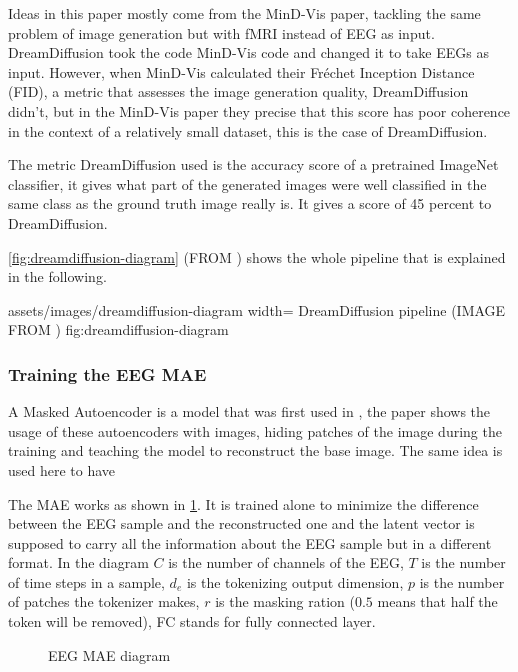 Ideas in this paper mostly come from the MinD-Vis \cite{mindvis} paper, tackling
the same problem of image generation but with fMRI instead of EEG as input.
DreamDiffusion took the code MinD-Vis code and changed it to take EEGs as input.
However, when MinD-Vis calculated their Fréchet Inception Distance \cite{fid}
(FID), a metric that assesses the image generation quality, DreamDiffusion
didn't, but in the MinD-Vis paper they precise that this score has poor
coherence in the context of a relatively small dataset, this is the case of
DreamDiffusion.

The metric DreamDiffusion used is the accuracy score of a pretrained ImageNet
classifier, it gives what part of the generated images were well classified in
the same class as the ground truth image really is. It gives a score of 45
percent to DreamDiffusion.

\cref{fig:dreamdiffusion-diagram} (FROM \cite{dreamdiffusion}) shows the whole
pipeline that is explained in the following.

\insertfigure
    {assets/images/dreamdiffusion-diagram}
    {width=\textwidth}
    {DreamDiffusion pipeline (IMAGE FROM \cite{dreamdiffusion})}
    {fig:dreamdiffusion-diagram}

\subsubsection{Training the EEG MAE}

A Masked Autoencoder is a model that was first used in \cite{mae}, the paper
shows the usage of these autoencoders with images, hiding patches of the image
during the training and teaching the model to reconstruct the base image. The
same idea is used here to have  

The MAE works as shown in \cref{fig:eeg-mae-diagram}. It is trained alone to
minimize the difference between the EEG sample and the reconstructed one and the
latent vector is supposed to carry all the information about the EEG sample but
in a different format. In the diagram $C$ is the number of channels of the EEG,
$T$ is the number of time steps in a sample, $d_e$ is the tokenizing output
dimension, $p$ is the number of patches the tokenizer makes, $r$ is the masking
ration ($0.5$ means that half the token will be removed), FC stands for fully
connected layer.

\begin{figure}[H]
    \centering
    \caption{EEG MAE diagram}
    
    \label{fig:eeg-mae-diagram}
\end{figure}

